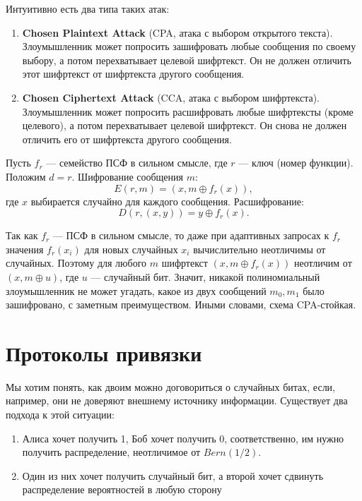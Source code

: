 Интуитивно есть два типа таких атак:
\begin{enumerate}
    \item \textbf{Chosen Plaintext Attack} (CPA, атака с выбором открытого текста). Злоумышленник может попросить зашифровать любые сообщения по своему выбору, а потом перехватывает целевой шифртекст. Он не должен отличить этот шифртекст от шифртекста другого сообщения.
    \item \textbf{Chosen Ciphertext Attack} (CCA, атака с выбором шифртекста). Злоумышленник может попросить расшифровать любые шифртексты (кроме целевого), а потом перехватывает целевой шифртекст. Он снова не должен отличить его от шифртекста другого сообщения.
\end{enumerate}

\begin{example}
    Пусть \(f_r\) --- семейство ПСФ в сильном смысле, где \(r\) --- ключ (номер функции). Положим \(d = r\).  
    Шифрование сообщения \(m\):
    \[
        E(r, m) = (x, m \oplus f_r(x)),
    \]
    где \(x\) выбирается случайно для каждого сообщения.  
    Расшифрование:
    \[
        D(r, (x, y)) = y \oplus f_r(x).
    \]

    Так как \(f_r\) --- ПСФ в сильном смысле, то даже при адаптивных запросах к \(f_r\) значения \(f_r(x_i)\) для новых случайных \(x_i\) вычислительно неотличимы от случайных. Поэтому для любого \(m\) шифртекст \((x, m \oplus f_r(x))\) неотличим от \((x, m \oplus u)\), где \(u\) --- случайный бит. Значит, никакой полиномиальный злоумышленник не может угадать, какое из двух сообщений \(m_0, m_1\) было зашифровано, с заметным преимуществом. Иными словами, схема CPA-стойкая.
\end{example}


\section{Протоколы привязки}

Мы хотим понять, как двоим можно договориться о случайных битах, если, например, они не доверяют внешнему источнику информации. Существует два подхода к этой ситуации:

\begin{enumerate}
    \item Алиса хочет получить 1, Боб хочет получить 0, соответственно, им нужно получить распределение, неотличимое от \(Bern(1/2)\).
    \item Один из них хочет получить случайный бит, а второй хочет сдвинуть распределение вероятностей в любую сторону
\end{enumerate}

